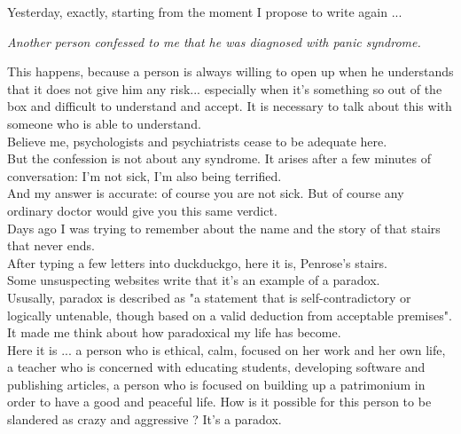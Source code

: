 \documentclass[11pt]{book}
\begin{document}
\noindent Yesterday, exactly, starting from the moment I propose to write again ...

\noindent \begin{center} \emph{Another person confessed to me that he was diagnosed with panic syndrome.} \end{center} 

\noindent This happens, because a person is always willing to open up when he understands that it does not give him any risk... especially when it's something so out of the box and difficult to understand and accept. It is necessary to talk about this with someone who is able to understand. \\

\noindent Believe me, psychologists and psychiatrists cease to be adequate here. \\

\noindent But the confession is not about any syndrome. It arises after a few minutes of conversation: I'm not sick, I'm also being terrified. \\ 

\noindent And my answer is accurate: of course you are not sick. But of course any ordinary doctor would give you this same verdict. \\

\noindent Days ago I was trying to remember about the name and the story of that stairs that never ends. \\

\noindent After typing a few letters into duckduckgo, here it is, Penrose's stairs. \\

\noindent Some unsuspecting websites write that it's an example of a paradox. \\

\noindent Ususally, paradox is described as "a statement that is self-contradictory or logically untenable, though based on a valid deduction from acceptable premises". \\

\noindent It made me think about how paradoxical my life has become.  \\

\noindent Here it is ... a person who is ethical, calm, focused on her work and her own life, a teacher who is concerned with educating students, developing software and publishing articles, a person who is focused on building up a patrimonium in order to have a good and peaceful life. How is it possible for this person to be slandered as crazy and aggressive ? It's a paradox. \\
\end{document}

